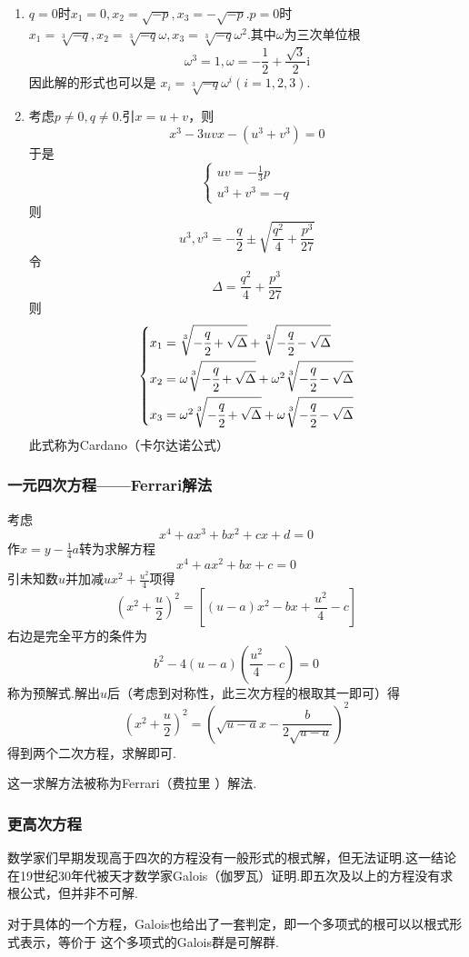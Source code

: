 \begin{enumerate}[label=\arabic*）]
    \item $q=0$时$x_1=0,x_2=\sqrt{-p},x_3=-\sqrt{-p}.p=0$时$x_1=\sqrt[3]{-q},x_2=\sqrt[3]{-q}\omega,x_3=\sqrt[3]{-q}\omega^2.$其中$\omega$为三次单位根
          \[
              \omega ^3=1,\omega = -\frac{1}{2}+\frac{\sqrt{3}}{2}\mathrm{i}
          \]
          因此解的形式也可以是
          $x_i=\sqrt[3]{-q}\omega^i\left(i=1,2,3
              \right)$.
    \item 考虑$p\neq 0,q\neq 0$.引$x=u+v$，则
          \[
              x^3-3uvx-\left(u^3+v^3\right)=0
          \]
          于是\[
              \begin{cases*}
                  uv=-\frac{1}{3}p \\
                  u^3+v^3=-q
              \end{cases*}
          \]
          则\[
              u^3,v^3=-\frac{q}{2}\pm \sqrt{\frac{q^2}{4}+\frac{p^3}{27}}
          \]
          令\[
              \Delta = \frac{q^2}{4}+\frac{p^3}{27}
          \]
          则
          \[
              \begin{cases*}
                  x_1=\sqrt[3]{-\cfrac{q}{2}+\sqrt{\Delta}}+\sqrt[3]{-\cfrac{q}{2}-\sqrt{\Delta}}                \\
                  x_2=\omega \sqrt[3]{-\cfrac{q}{2}+\sqrt{\Delta}}+\omega^2\sqrt[3]{-\cfrac{q}{2}-\sqrt{\Delta}} \\
                  x_3=\omega^2 \sqrt[3]{-\cfrac{q}{2}+\sqrt{\Delta}}+\omega\sqrt[3]{-\cfrac{q}{2}-\sqrt{\Delta}}
              \end{cases*}
          \]
          此式称为Cardano（卡尔达诺公式）
\end{enumerate}

\subsubsection{一元四次方程——Ferrari解法}
考虑\[
    x^4+ax^3+bx^2+cx+d=0
\]
作$\displaystyle
    x=y-\frac{1}{4}a$转为求解方程
\[
    x^4+ax^2+bx+c=0
\]
引未知数$u$并加减$\displaystyle
    ux^2+\frac{u^2}{4}$项得
\[
    \left(x^2+\frac{u}{2}\right)^2=\left[
        \left(u-a\right)x^2-bx+\frac{u^2}{4}-c
        \right]
\]
右边是完全平方的条件为
\[
    b^2-4\left(u-a\right)\left(\frac{u^2}{4}-c\right)=0
\]
称为预解式.解出$u$后（考虑到对称性，此三次方程的根取其一即可）得\[
    \left(x^2+\frac{u}{2}\right)^2=
    \left(
    \sqrt{u-a}x-\frac{b}{2\sqrt{u-a}}
    \right)^2
\]
得到两个二次方程，求解即可.

这一求解方法被称为Ferrari（费拉里
）解法.
\subsubsection{更高次方程}
数学家们早期发现高于四次的方程没有一般形式的根式解，但无法证明.这一结论在19世纪30年代被天才数学家Galois（伽罗瓦）证明.即五次及以上的方程没有求根公式，但并非不可解.

对于具体的一个方程，Galois也给出了一套判定，即一个多项式的根可以以根式形式表示，等价于
这个多项式的Galois群是可解群.